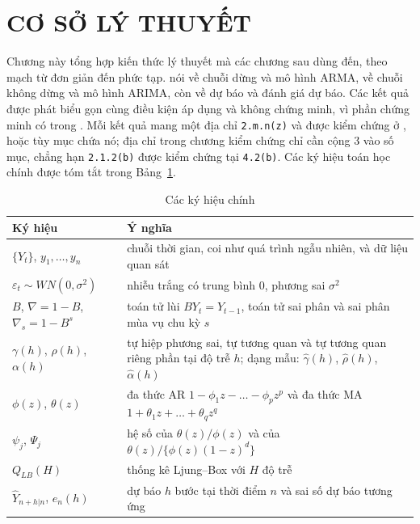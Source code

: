 \clearpage
\section[Cơ sở lý thuyết]{CƠ SỞ LÝ THUYẾT}

Chương này tổng hợp kiến thức lý thuyết mà các chương sau dùng đến, theo mạch từ đơn giản đến phức tạp.  nói về chuỗi dừng và mô hình ARMA,  về chuỗi không dừng và mô hình ARIMA, còn  về dự báo và đánh giá dự báo. Các kết quả được phát biểu gọn cùng điều kiện áp dụng và không chứng minh, vì phần chứng minh có trong . Mỗi kết quả mang một địa chỉ \texttt{2.m.n(z)} và được kiểm chứng ở ,  hoặc  tùy mục chứa nó; địa chỉ trong chương kiểm chứng chỉ cần cộng $3$ vào số mục, chẳng hạn \texttt{2.1.2(b)} được kiểm chứng tại \texttt{4.2(b)}. Các ký hiệu toán học chính được tóm tắt trong Bảng~\ref{tab:kyhieu}.

\begin{table}[H]
\centering\small
\caption{Các ký hiệu chính}\label{tab:kyhieu}
\renewcommand{\arraystretch}{1.25}
\begin{tabular}{|p{3.4cm}|p{12.6cm}|}
\toprule
Ký hiệu & Ý nghĩa \\
\midrule
$\{Y_t\}$, $y_1,\dots,y_n$ & chuỗi thời gian, coi như quá trình ngẫu nhiên, và dữ liệu quan sát \\
$\varepsilon_t\sim WN(0,\sigma^2)$ & nhiễu trắng có trung bình $0$, phương sai $\sigma^2$ \\
$B$, $\nabla=1-B$, $\nabla_s=1-B^s$ & toán tử lùi $BY_t=Y_{t-1}$, toán tử sai phân và sai phân mùa vụ chu kỳ $s$ \\
$\gamma(h)$, $\rho(h)$, $\alpha(h)$ & tự hiệp phương sai, tự tương quan và tự tương quan riêng phần tại độ trễ $h$; dạng mẫu: $\hat\gamma(h)$, $\hat\rho(h)$, $\hat\alpha(h)$ \\
$\phi(z)$, $\theta(z)$ & đa thức AR $1-\phi_1z-\dots-\phi_pz^p$ và đa thức MA $1+\theta_1z+\dots+\theta_qz^q$ \\
$\psi_j$, $\Psi_j$ & hệ số của $\theta(z)/\phi(z)$ và của $\theta(z)/\{\phi(z)(1-z)^d\}$ \\
$Q_{LB}(H)$ & thống kê Ljung--Box với $H$ độ trễ \\
$\hat Y_{n+h|n}$, $e_n(h)$ & dự báo $h$ bước tại thời điểm $n$ và sai số dự báo tương ứng \\
\bottomrule
\end{tabular}
\end{table}


